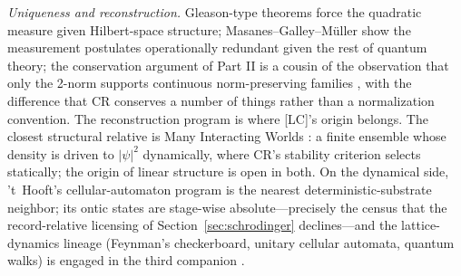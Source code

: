 \documentclass[11pt]{article}
\theoremstyle{definition}
\theoremstyle{remark}
\begin{document}
\emph{Uniqueness and reconstruction.} Gleason-type theorems \cite{Gleason1957,Busch2003} force the quadratic measure given Hilbert-space structure; Masanes--Galley--M\"uller \cite{MGM2019} show the measurement postulates operationally redundant given the rest of quantum theory; the conservation argument of Part II is a cousin of the observation that only the 2-norm supports continuous norm-preserving families \cite{Aaronson2004,Lamperti1958}, with the difference that CR conserves a number of things rather than a normalization convention. The reconstruction program \cite{Hardy2001,CDP2011,MasanesMuller2011} is where [LC]'s origin belongs. The closest structural relative is Many Interacting Worlds \cite{HDW2014}: a finite ensemble whose density is driven to $|\psi|^2$ dynamically, where CR's stability criterion selects statically; the origin of linear structure is open in both. On the dynamical side, 't~Hooft's cellular-automaton program \cite{tHooft2016} is the nearest deterministic-substrate neighbor; its ontic states are stage-wise absolute---precisely the census that the record-relative licensing of Section~\ref{sec:schrodinger} declines---and the lattice-dynamics lineage (Feynman's checkerboard, unitary cellular automata, quantum walks) is engaged in the third companion \cite{TillittSchr}.
\end{document}
